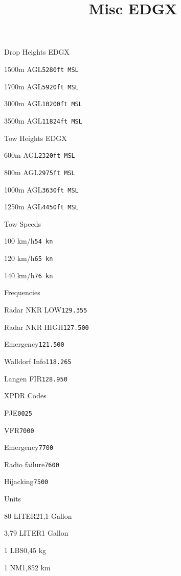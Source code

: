 \def\papersize{6}




\title{Misc EDGX}

\begin{checklist}{Drop Heights EDGX}
    \item{1500m AGL}{\texttt{5280ft MSL}}
    \item{1700m AGL}{\texttt{5920ft MSL}}
    \item{3000m AGL}{\texttt{10200ft MSL}}
    \item{3500m AGL}{\texttt{11824ft MSL}}
  \end{checklist}

\begin{checklist}{Tow Heights EDGX}
    \item{600m AGL}{\texttt{2320ft MSL}}
    \item{800m AGL}{\texttt{2975ft MSL}}
    \item{1000m AGL}{\texttt{3630ft MSL}}
    \item{1250m AGL}{\texttt{4450ft MSL}}
  \end{checklist}
  
  \begin{checklist}{Tow Speeds}
    \item{100 km/h}{\texttt{54 kn}}
    \item{120 km/h}{\texttt{65 kn}}
    \item{140 km/h}{\texttt{76 kn}}
  \end{checklist}
  
  \begin{checklist}{Frequencies}
    \item{Radar NKR LOW}{\texttt{129.355}}
    \item{Radar NKR HIGH}{\texttt{127.500}}
    \item{Emergency}{\texttt{121.500}}
    \item{Walldorf Info}{\texttt{118.265}}
    \item{Langen FIR}{\texttt{128.950}}
  \end{checklist}
  
  \begin{checklist}{XPDR Codes}
    \item{PJE}{\texttt{0025}}
    \item{VFR}{\texttt{7000}}
    \item{Emergency}{\texttt{7700}}
    \item{Radio failure}{\texttt{7600}}
    \item{Hijacking}{\texttt{7500}}
  \end{checklist}
  
  \begin{checklist}{Units}
    \item{80 LITER}{21,1 Gallon}
    \item{3,79 LITER}{1 Gallon}
    \item{1 LBS}{0,45 kg}
    \item{1 NM}{1,852 km}
  \end{checklist}
